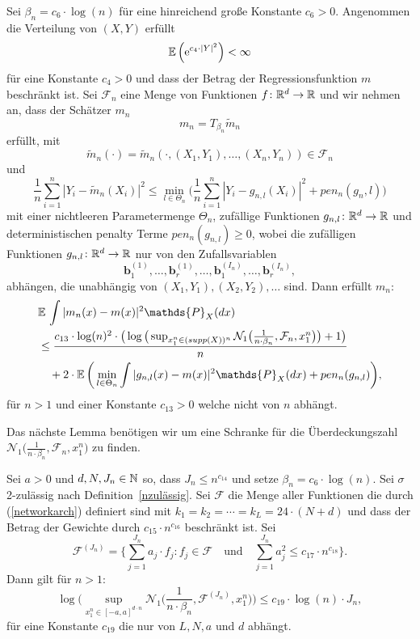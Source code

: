   \begin{lem}
  \label{lem:8}
Sei $\beta_n = c_6 \cdot \log(n)$ für eine hinreichend große Konstante $c_6 > 0$. Angenommen die Verteilung von $(X, Y)$ erfüllt 
$$ \mathbb{E}\,\Big(\mathrm{e}^{c_4 \cdot |Y|^2}\Big) < \infty$$
für eine Konstante $c_4 > 0$ und dass der Betrag der Regressionsfunktion $m$ beschränkt ist. Sei $\mathcal{F}_n$ eine Menge von Funktionen $f\colon \mathbb{R}^d \to \mathbb{R}$ und wir nehmen an, dass der Schätzer $m_n$ 
$$m_n = T_{\beta_n}\tilde{m}_n$$ 
erfüllt, mit 
$$\tilde{m}_n(\cdot) = \tilde{m}_n(\cdot,(X_1, Y_1),\dots,(X_n, Y_n)) \in \mathcal{F}_n$$
und 
$$\frac{1}{n} \sum_{i = 1}^n |Y_i - \tilde{m}_n(X_i)|^2 \leq \min_{l \in \Theta_n}\bigg(\frac{1}{n}\sum_{i = 1}^n |Y_i - g_{n,l}(X_i)|^2 + pen_n(g_n,l)\bigg)$$
mit einer nichtleeren Parametermenge $\Theta_n$, zufällige Funktionen $g_{n,l}\colon \mathbb{R}^d \to \mathbb{R}$ und deterministischen penalty Terme $pen_n(g_{n,l}) \geq 0$, wobei die zufälligen Funktionen $g_{n,l}\colon \mathbb{R}^d \to \mathbb{R}$ nur von den Zufallsvariablen
$$\mathbf{b}_1^{(1)},\dots,\mathbf{b}_r^{(1)},\dots,\mathbf{b}_1^{(I_n)},\dots,\mathbf{b}_r^{(I_n)},$$
abhängen, die unabhängig von $(X_1, Y_1), (X_2, Y_2),\dots$ sind.
Dann erfüllt $m_n\colon$
\begin{equation*}
\begin{split}
& \E \int |m_n(x) - m(x)|^2 \mathds{P}_X(dx) \\
& \leq \frac{c_{13} \cdot \log(n)^2 \cdot \big(\log\big(\sup_{x_1^n \in (supp(X))^n}\mathcal{N}_1\big(\frac{1}{n \cdot \beta_n},\mathcal{F}_n,x_1^n\big)\big) + 1\big)}{n} \\
& \quad + 2 \cdot \E\bigg(\min_{l \in \Theta_n} \int |g_{n,l}(x) - m(x)|^2 \mathds{P}_X(dx) + pen_n(g_{n,l})\bigg),
\end{split}
\end{equation*}
für $n > 1$ und einer Konstante $c_{13} > 0$ welche nicht von $n$ abhängt.
  \end{lem}
Das nächste Lemma benötigen wir um eine Schranke für die Überdeckungszahl $\mathcal{N}_1\big(\frac{1}{n \cdot \beta_n},\mathcal{F}_n,x_1^n\big)$ zu finden.
\begin{lem}
\label{lem:9}
Sei $a > 0$ und $d, N, J_n \in \mathbb{N}$ so, dass $J_n \leq n^{c_{14}}$ und setze $\beta_n = c_6 \cdot \log(n).$
Sei $\sigma$ 2-zulässig nach Definition~\ref{nzulässig}. Sei $\mathcal{F}$ die Menge aller Funktionen die durch (\ref{networkarch}) definiert sind mit $k_1 = k_2 = \cdots = k_L = 24 \cdot (N + d)$ und dass der Betrag der Gewichte durch $c_{15} \cdot n^{c_{16}}$ beschränkt ist. Sei
$$ \mathcal{F}^{(J_n)} = \biggl\{\sum_{j = 1}^{J_n} a_j \cdot f_j : f_j \in \mathcal{F} \quad \text{und} \quad \sum_{j = 1}^{J_n} a_j^2 \leq c_{17} \cdot n^{c_{18}}\biggr\}.$$
Dann gilt für $n > 1:$
$$\log\bigg(\sup_{x_1^n\in[-a,a]^{d \cdot n}} \mathcal{N}_1\bigg(\frac{1}{n \cdot \beta_n}, \mathcal{F}^{(J_n)},x_1^n\bigg)\bigg) \leq c_{19} \cdot \log(n) \cdot J_n,$$
für eine Konstante $c_{19}$ die nur von $L, N, a$ und $d$ abhängt.
\end{lem}